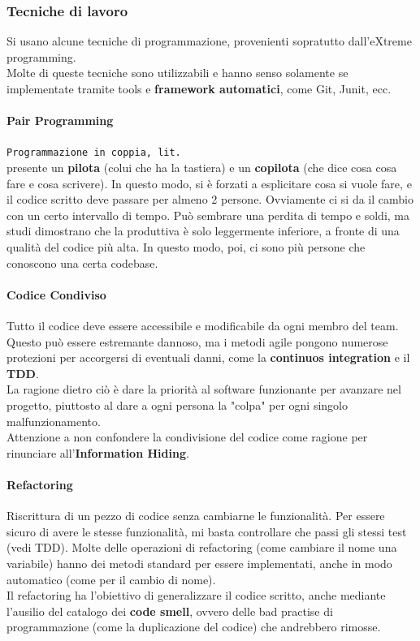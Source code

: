 \documentclass[a4paper,12pt]{article}
\begin{document}
\subsubsection{Tecniche di lavoro}
Si usano alcune tecniche di programmazione, provenienti sopratutto dall'eXtreme programming.\\
Molte di queste tecniche sono utilizzabili e hanno senso solamente se implementate tramite tools e \textbf{framework automatici}, come Git, Junit, ecc.
\paragraph{Pair Programming}
\texttt{Programmazione in coppia, lit.}\\
	\E presente un \textbf{pilota} (colui che ha la tastiera) e un \textbf{copilota} (che dice cosa cosa fare e cosa scrivere). In questo modo, si è forzati a esplicitare cosa si vuole fare, e il codice scritto deve passare per almeno 2 persone. Ovviamente ci si da il cambio con un certo intervallo di tempo. Può sembrare una perdita di tempo e soldi, ma studi dimostrano che la produttiva è solo leggermente inferiore, a fronte di una qualità del codice più alta. In questo modo, poi, ci sono più persone che conoscono una certa codebase.
	
\paragraph{Codice Condiviso}
Tutto il codice deve essere accessibile e modificabile da ogni membro del team. Questo può essere estremante dannoso, ma i metodi agile pongono numerose protezioni per accorgersi di eventuali danni, come la \textbf{continuos integration} e il \textbf{TDD}.\\ La ragione dietro ciò è dare la priorità al software funzionante per avanzare nel progetto, piuttosto al dare a ogni persona la "colpa" per ogni singolo malfunzionamento.\\
Attenzione a non confondere la condivisione del codice come ragione per rinunciare all'\textbf{Information Hiding}.


\paragraph{Refactoring}
Riscrittura di un pezzo di codice senza cambiarne le funzionalità. Per essere sicuro di avere le stesse funzionalità, mi basta controllare che passi gli stessi test (vedi TDD). Molte delle operazioni di refactoring (come cambiare il nome una variabile) hanno dei metodi standard per essere implementati, anche in modo automatico (come per il cambio di nome).\\
Il refactoring ha l'obiettivo di generalizzare il codice scritto, anche mediante l'ausilio del catalogo dei \textbf{code smell}, ovvero delle bad practise di programmazione (come la duplicazione del codice) che andrebbero rimosse.
\end{document}
